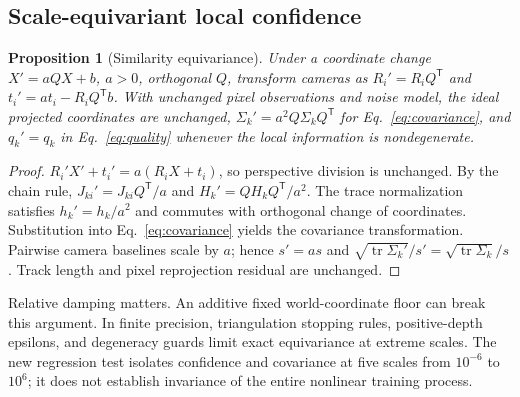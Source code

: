 \documentclass[10pt,twocolumn,letterpaper]{article}
\newtheorem{proposition}{Proposition}
\begin{document}
\subsection{Scale-equivariant local confidence}
\begin{proposition}[Similarity equivariance]
Under a coordinate change $X'=aQX+b$, $a>0$, orthogonal $Q$, transform cameras as $R_i'=R_iQ^{\mathsf T}$ and $t_i'=a t_i-R_iQ^{\mathsf T}b$. With unchanged pixel observations and noise model, the ideal projected coordinates are unchanged, $\Sigma_k'=a^2Q\Sigma_kQ^{\mathsf T}$ for Eq.~\eqref{eq:covariance}, and $q_k'=q_k$ in Eq.~\eqref{eq:quality} whenever the local information is nondegenerate.
\end{proposition}
\begin{proof}
$R_i'X'+t_i'=a(R_iX+t_i)$, so perspective division is unchanged. By the chain rule, $J_{ki}'=J_{ki}Q^{\mathsf T}/a$ and $H_k'=QH_kQ^{\mathsf T}/a^2$. The trace normalization satisfies $h_k'=h_k/a^2$ and commutes with orthogonal change of coordinates. Substitution into Eq.~\eqref{eq:covariance} yields the covariance transformation. Pairwise camera baselines scale by $a$; hence $s'=as$ and $\sqrt{\operatorname{tr}\Sigma_k'}/s'=\sqrt{\operatorname{tr}\Sigma_k}/s$. Track length and pixel reprojection residual are unchanged.
\end{proof}
Relative damping matters. An additive fixed world-coordinate floor can break this argument. In finite precision, triangulation stopping rules, positive-depth epsilons, and degeneracy guards limit exact equivariance at extreme scales. The new regression test isolates confidence and covariance at five scales from $10^{-6}$ to $10^{6}$; it does not establish invariance of the entire nonlinear training process.
\end{document}
